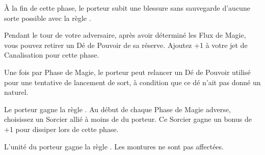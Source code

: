 À la fin de cette phase, le porteur subit une blessure sans sauvegarde d'aucune sorte possible avec la règle .

\endpricelist

\columnbreak
\armyarcaneitems

\startpricelist

Pendant le tour de votre adversaire, après avoir déterminé les Flux de Magie, vous pouvez retirer un Dé de Pouvoir de sa réserve. Ajoutez +1 à votre jet de Canalisation pour cette phase.

Une fois par Phase de Magie, le porteur peut relancer un Dé de Pouvoir utilisé pour une tentative de lancement de sort, à condition que ce dé n'ait pas donné un  naturel.

\endpricelist

\armymagicalbanners

\startpricelist

Le porteur gagne la règle \channel{}. Au début de chaque Phase de Magie adverse, choisissez un Sorcier allié à moins de  du porteur. Ce Sorcier gagne un bonus de +1 pour dissiper lors de cette phase.

L'unité du porteur gagne la règle \thunderouscharge{}. Les montures ne sont pas affectées.

\endpricelist

\closearmymagicalitems








\quickrefsheettitle

